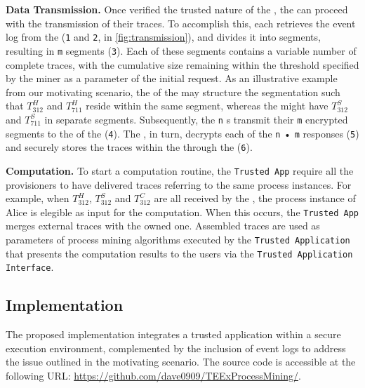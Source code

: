 \textbf{Data Transmission.} Once verified the trusted nature of the , the  can proceed with the transmission of their traces. To accomplish this, each  retrieves the event log from the  (\texttt{1} and \texttt{2}, in \cref{fig:transmission}), and divides it into segments, resulting in \texttt{m} segments (\texttt{3}). Each of these segments contains a variable number of complete traces, with the cumulative size remaining within the threshold specified by the miner as a parameter of the initial request. As an illustrative example from our motivating scenario, the  of the  may structure the segmentation such that $T^H_{312}$ and $T^H_{711}$ reside within the same segment, whereas the  might have $T^S_{312}$ and $T^S_{711}$ in separate segments. Subsequently, the \texttt{n} s transmit their \texttt{m} encrypted segments to the  of the  (\texttt{4}). The , in turn, decrypts each of the \texttt{n} • \texttt{m} responses (\texttt{5}) and securely stores the traces within the  through the  (\texttt{6}).

\textbf{Computation.} To start a computation routine, the \texttt{Trusted App} require all the provisioners to have delivered traces referring to the same process instances. For example, when $T^H_{312}$, $T^S_{312}$ and $T^C_{312}$ are all received by the , the process instance of Alice is elegible as input for the computation. When this occurs, the \texttt{Trusted App} merges external traces with the owned one. Assembled traces are used as parameters of process mining algorithms executed by the \texttt{Trusted Application} that presents the computation results to the users via the \texttt{Trusted Application Interface}.








\subsection{Implementation}
\label{sec:implementation:details}
The proposed implementation integrates a trusted application within a secure execution environment, complemented by the inclusion of event logs to address the issue outlined in the motivating scenario. The source code is accessible at the following URL: \url{https://github.com/dave0909/TEExProcessMining/}. 

